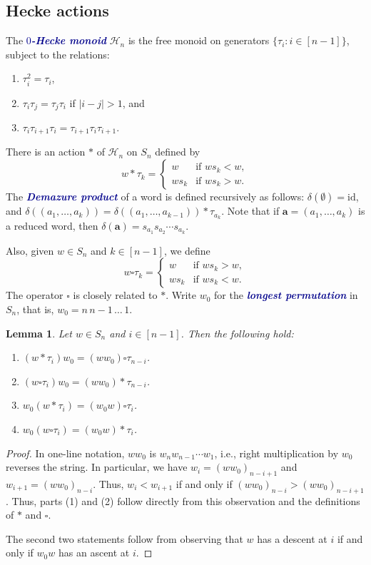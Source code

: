 \documentclass[12 pt]{amsart}
\newcommand{\newword}[1]{\textcolor{darkblue}{\textbf{\emph{#1}}}}
\newcommand{\id}{\mathrm{id}}
\newtheorem{lemma}[Theorem]{Lemma}
\numberwithin{equation}{section}
\theoremstyle{remark}
\newcommand{\demprod}{\delta}
\begin{document}
	\subsection{Hecke actions}
	
	The \newword{$0$-Hecke monoid} $\mathcal H_n$ is the free monoid on generators $\{\tau_i:i \in[n-1]\}$, subject to the relations:
	\begin{enumerate}
		\item $\tau_i^2 = \tau_i$,
		\item $\tau_i \tau_j = \tau_j \tau_i$ if $|i - j| > 1$, and
		\item $\tau_i \tau_{i + 1} \tau_i = \tau_{i + 1} \tau_{i} \tau_{i + 1}$.
	\end{enumerate}
	There is an action $*$ of $\mathcal H_n$ on $S_n$ defined by
	\[w* \tau_k = 
	\begin{cases}
		w &\text{if } w s_k < w,\\
		w s_k & \text{if } w s_k > w.
	\end{cases}\]
	The \newword{Demazure product} of a word is defined recursively as follows: $\demprod(\emptyset) = \id$, and $\demprod((a_1, \ldots, a_k)) = \demprod((a_1, \ldots, a_{k-1}))*\tau_{a_k}$. 
	Note that if $\mathbf{a}=(a_1, \ldots, a_k)$ is a reduced word, then $\demprod(\mathbf{a})=s_{a_1}s_{a_2}\cdots s_{a_k}$.
		
	Also, given $w \in S_n$ and $k \in [n - 1]$, we define 
	\[w \square \tau_k = 
	\begin{cases}
		w &\text{if } w s_k > w, \\
		w s_k & \text{if } w s_k < w.
	\end{cases}\]
	The operator $\square$ is closely related to $*$. 
	Write $w_0$ for the \newword{longest permutation} in $S_n$, that is, $w_0= n \, n-1 \, \ldots \, 1$.
	\begin{lemma}
		\label{lemma:upanddownoperatorswithflips}
		Let $w \in S_n$ and $i \in [n - 1]$. 
		Then the following hold:
		\begin{enumerate}
			\item $(w * \tau_i) w_0 = (w w_0)\square \tau_{n - i}$.
			\item $(w\square \tau_i) w_0 = (w w_0)* \tau_{n - i}$.
			\item $w_0 (w*\tau_i)= (w_0w) \square \tau_i$.
			\item $w_0 (w\square \tau_i)=(w_0 w)*\tau_i$.
		\end{enumerate}
	\end{lemma}
	\begin{proof}
		In one-line notation, $ww_0$ is $w_{n}w_{n-1}\cdots w_1$, i.e., right multiplication by $w_0$ reverses the string. 
		In particular, we have $w_i=(w w_0)_{n - i + 1}$ and $w_{i + 1} = (w w_0)_{n - i}$.
		Thus, $w_i < w_{i + 1}$ if and only if $(w w_0)_{n-i} > (w w_0)_{n-i + 1}$. 
		Thus, parts (1) and (2) follow directly from this observation and the definitions of $*$ and $\square$.
		
		The second two statements follow from observing that $w$ has a descent at $i$ if and only if $w_0w$ has an ascent at $i$.
	\end{proof}
	
\end{document}
